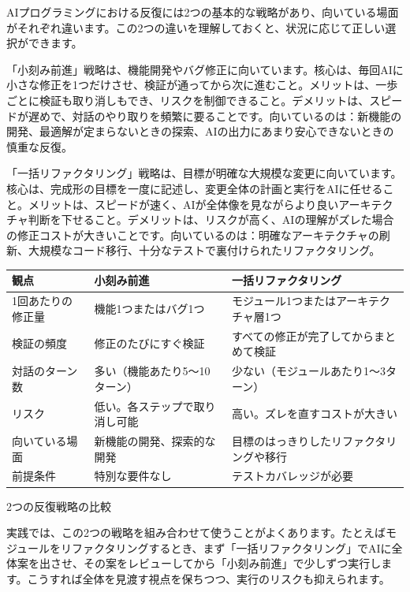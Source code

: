 AIプログラミングにおける反復には2つの基本的な戦略があり、向いている場面がそれぞれ違います。この2つの違いを理解しておくと、状況に応じて正しい選択ができます。

「小刻み前進」戦略は、機能開発やバグ修正に向いています。核心は、毎回AIに小さな修正を1つだけさせ、検証が通ってから次に進むこと。メリットは、一歩ごとに検証も取り消しもでき、リスクを制御できること。デメリットは、スピードが遅めで、対話のやり取りを頻繁に要ることです。向いているのは：新機能の開発、最適解が定まらないときの探索、AIの出力にあまり安心できないときの慎重な反復。

「一括リファクタリング」戦略は、目標が明確な大規模な変更に向いています。核心は、完成形の目標を一度に記述し、変更全体の計画と実行をAIに任せること。メリットは、スピードが速く、AIが全体像を見ながらより良いアーキテクチャ判断を下せること。デメリットは、リスクが高く、AIの理解がズレた場合の修正コストが大きいことです。向いているのは：明確なアーキテクチャの刷新、大規模なコード移行、十分なテストで裏付けられたリファクタリング。

\begin{center}
\begin{tabularx}{\linewidth}{|X|X|X|}
\hline
\textbf{観点} & \textbf{小刻み前進} & \textbf{一括リファクタリング} \tabularnewline
\hline
1回あたりの修正量 & 機能1つまたはバグ1つ & モジュール1つまたはアーキテクチャ層1つ \tabularnewline
検証の頻度 & 修正のたびにすぐ検証 & すべての修正が完了してからまとめて検証 \tabularnewline
対話のターン数 & 多い（機能あたり5〜10ターン） & 少ない（モジュールあたり1〜3ターン） \tabularnewline
リスク & 低い。各ステップで取り消し可能 & 高い。ズレを直すコストが大きい \tabularnewline
向いている場面 & 新機能の開発、探索的な開発 & 目標のはっきりしたリファクタリングや移行 \tabularnewline
前提条件 & 特別な要件なし & テストカバレッジが必要 \tabularnewline
\hline
\end{tabularx}
\end{center}

\begin{center}\small\color{gray}2つの反復戦略の比較\end{center}

実践では、この2つの戦略を組み合わせて使うことがよくあります。たとえばモジュールをリファクタリングするとき、まず「一括リファクタリング」でAIに全体案を出させ、その案をレビューしてから「小刻み前進」で少しずつ実行します。こうすれば全体を見渡す視点を保ちつつ、実行のリスクも抑えられます。


